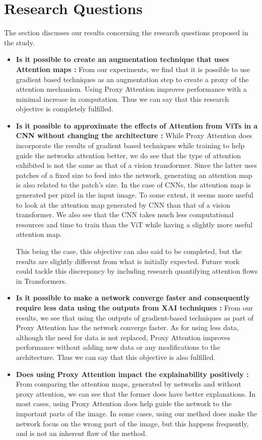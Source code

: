 \documentclass[a4paper,11pt,openright]{book}
\begin{document}
\section{Research Questions}

 
The section discusses our results concerning the research questions proposed in the study.
\begin{itemize}
\item \textbf{Is it possible to create an augmentation technique that uses Attention maps :} From our experiments, we find that it is possible to use gradient based techniques as an augmentation step to create a proxy of the attention mechanism. Using Proxy Attention improves performance with a minimal increase in computation. Thus we can say that this research objective is completely fulfilled.
\item \textbf{Is it possible to approximate the effects of Attention from ViTs in a CNN without changing the architecture :} While Proxy Attention does incorporate the results of gradient based techniques while training to help guide the networks attention better, we do see that the type of attention exhibited is not the same as that of a vision transformer. Since the latter uses patches of a fixed size to feed into the network, generating an attention map is also related to the patch's size. In the case of CNNs, the attention map is generated per pixel in the input image. To some extent, it seems more useful to look at the attention map generated by CNN than that of a vision transformer. We also see that the CNN takes much less computational resources and time to train than the ViT while having a slightly more useful attention map. 

This being the case, this objective can also said to be completed, but the results are slightly different from what is initially expected. Future work could tackle this discrepancy by including research quantifying attention flows in Transformers. \cite{abnarQuantifyingAttentionFlow2020}
\item \textbf{Is it possible to make a network converge faster and consequently require less data using the outputs from XAI techniques :} From our results, we see that using the outputs of gradient-based techniques as part of Proxy Attention has the network converge faster. As for using less data, although the need for data is not replaced, Proxy Attention improves performance without adding new data or any modifications to the architecture. Thus we can say that this objective is also fulfilled.
\item \textbf{Does using Proxy Attention impact the explainability positively :} From comparing the attention maps, generated by networks and without proxy attention, we can see that the former does have better explanations. In most cases, using Proxy Attention does help guide the network to the important parts of the image. In some cases, using our method does make the network focus on the wrong part of the image, but this happens frequently, and is not an inherent flaw of the method.


\end{itemize}
\end{document}
